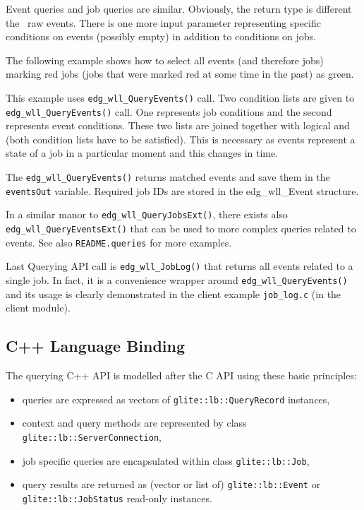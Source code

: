 Event queries and job queries are similar. Obviously, the return type is
different \Dash the \LB\ raw events. There is one more input parameter
representing specific conditions on events (possibly empty) in addition to
conditions on jobs.

The following example shows how to select all events (and therefore jobs)
marking red jobs (jobs that were marked red at some time in the past) as green.





This example uses \texttt{edg\_wll\_QueryEvents()} call. Two condition lists are
given to \texttt{edg\_wll\_QueryEvents()} call. One represents job conditions and
the second represents event conditions. These two lists are joined together with
logical and (both condition lists have to be satisfied). This is necessary as
events represent a state of a job in a particular moment and this changes in time.



The \texttt{edg\_wll\_QueryEvents()} returns matched events and save them in the
\texttt{eventsOut} variable. Required job IDs are stored in the edg\_wll\_Event
structure.



In a similar manor to \texttt{edg\_wll\_QueryJobsExt()}, there exists also \texttt{edg\_wll\_QueryEventsExt()} 
that can be used to more complex queries related to events. See also \texttt{README.queries} for more examples.


Last \LB Querying API call is \texttt{edg\_wll\_JobLog()} that returns all events related to a single job.
In fact, it is a convenience wrapper around \texttt{edg\_wll\_QueryEvents()} and its usage is clearly
demonstrated in the client example \texttt{job\_log.c} (in the client module).



\subsection{C++ Language Binding}
The querying C++ \LB API is modelled after the C \LB API using these basic principles:
\begin{itemize}
\item queries are expressed as vectors of
\verb'glite::lb::QueryRecord' instances,
\item \LB context and query methods are represented by class
\verb'glite::lb::ServerConnection',
\item \LB job specific queries are encapsulated within class
\verb'glite::lb::Job',
\item query results are returned as (vector or list of)
\verb'glite::lb::Event' or \verb'glite::lb::JobStatus' read-only instances.
\end{itemize}


